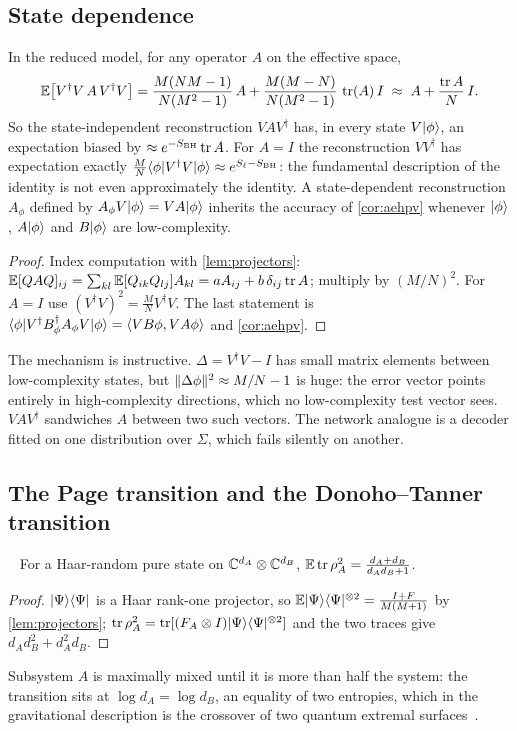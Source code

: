 \subsection{State dependence}\label{sec:state-dependence}
\begin{proposition}\label{prop:statedep}\proved
In the reduced model, for any operator $A$ on the effective space,
\[
\mathbb E\big[V^\dagger V\,A\,V^\dagger V\big]=\frac{M(NM-1)}{N(M^2-1)}\,A+\frac{M(M-N)}{N(M^2-1)}\,\operatorname{tr}(A)\,I\;\approx\;A+\frac{\operatorname{tr} A}{N}\,I .
\]
So the state-independent reconstruction $VAV^\dagger$ has, in every state $V|\phi\rangle$, an expectation biased by
$\approx e^{-S_{\rm BH}}\operatorname{tr} A$. For $A=I$ the reconstruction $VV^\dagger$ has expectation exactly
$\frac MN\langle \phi| V^\dagger V|\phi\rangle\approx e^{S_\ell-S_{\rm BH}}$: the fundamental description of the identity is
not even approximately the identity. A state-dependent reconstruction $A_\phi$ defined by $A_\phi V|\phi\rangle=VA|\phi\rangle$
inherits the accuracy of \cref{cor:aehpv} whenever $|\phi\rangle$, $A|\phi\rangle$ and $B|\phi\rangle$ are low-complexity.
\end{proposition}
\begin{proof}
Index computation with \cref{lem:projectors}: $\mathbb E[QAQ]_{ij}=\sum_{kl}\mathbb E[Q_{ik}Q_{lj}]A_{kl}=aA_{ij}+b\,\delta_{ij}\operatorname{tr} A$;
multiply by $(M/N)^2$. For $A=I$ use $(V^\dagger V)^2=\frac MNV^\dagger V$. The last statement is
$\langle \phi| V^\dagger B_\phi^\dagger A_\phi V|\phi\rangle=\langle VB\phi,VA\phi\rangle$ and \cref{cor:aehpv}.
\end{proof}
The mechanism is instructive. $\Delta=V^\dagger V-I$ has small matrix elements between low-complexity states, but
$\lVert \Delta\phi\rVert^2\approx M/N-1$ is huge: the error vector points entirely in high-complexity directions, which no
low-complexity test vector sees. $VAV^\dagger$ sandwiches $A$ between two such vectors. The network analogue is a
decoder fitted on one distribution over $\Sigma$, which fails silently on another.

\subsection{The Page transition and the Donoho--Tanner transition}\label{sec:page}
\begin{proposition}\proved\ \numchk
For a Haar-random pure state on $\mathbb C^{d_A}\otimes\mathbb C^{d_B}$, $\mathbb E\operatorname{tr}\rho_A^2=\frac{d_A+d_B}{d_Ad_B+1}$.
\end{proposition}
\begin{proof}
$|\Psi\rangle\langle \Psi|$ is a Haar rank-one projector, so $\mathbb E|\Psi\rangle\langle \Psi|^{\otimes2}=\frac{I+F}{M(M+1)}$ by
\cref{lem:projectors}; $\operatorname{tr}\rho_A^2=\operatorname{tr}[(F_A\otimes I)|\Psi\rangle\langle \Psi|^{\otimes2}]$ and the two traces give
$d_Ad_B^2+d_A^2d_B$.
\end{proof}
Subsystem $A$ is maximally mixed until it is more than half the system: the transition sits at $\log d_A=\log d_B$,
an equality of two entropies, which in the gravitational description is the crossover of two quantum extremal
surfaces~\cite{Penington,AEMM}.

